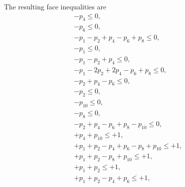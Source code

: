 \documentclass[%
  twocolumn,
 showpacs,
 showkeys,
 preprintnumbers,
 amsmath,amssymb,
 aps,
  pra,
  longbibliography,
 floatfix,
 ]{revtex4-1}
\begin{document}
The resulting face inequalities are
\begin{eqnarray}
                     - p_4                                                                                 \le     0 , \\
                                   - p_6                                                                   \le     0 , \\
- p_1  - p_2         + p_4         - p_6         + p_8                                                     \le     0 , \\
- p_1                                                                                                      \le     0 , \\
- p_1  - p_2         + p_4                                                                                 \le     0 , \\
- p_1  -2p_2         +2p_4         - p_6         + p_8                                                     \le     0 , \\
       - p_2         + p_4         - p_6                                                                   \le     0 , \\
       - p_2                                                                                               \le     0 , \\
                                                               - p_{10}                                    \le     0 , \\
                                                 - p_8                                                     \le     0 , \\
       - p_2         + p_4         - p_6         + p_8         - p_{10}                                    \le     0 , \\
                     + p_4                                     + p_{10}                                    \le    +1 , \\
+ p_1  + p_2         - p_4         + p_6         - p_8         + p_{10}                                    \le    +1 , \\
+ p_1  + p_2                                     - p_8         + p_{10}                                    \le    +1 , \\
+ p_1  + p_2                                                                                               \le    +1 , \\
+ p_1  + p_2         - p_4         + p_6                                                                   \le    +1 , \\

\end{eqnarray}
\end{document}
